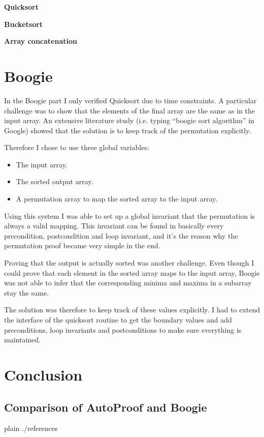 \documentclass[a4paper,10pt]{article}
\begin{document}
\textbf{Quicksort}

\textbf{Bucketsort}

\textbf{Array concatenation}

\section {Boogie}

In the Boogie part I only verified Quicksort due to time constraints.
A particular challenge was to show that the elements of the final array are the same as in the input array.
An extensive literature study (i.e. typing ``boogie sort algorithm'' in Google) showed that the solution is to 
keep track of the permutation explicitly.

Therefore I chose to use three global variables:
\begin{itemize}
 \item The input array.
 \item The sorted output array.
 \item A permutation array to map the sorted array to the input array.
\end{itemize}

Using this system I was able to set up a global invariant that the permutation is always a valid mapping.
This invariant can be found in basically every precondition, postcondition and loop invariant, and it's the reason why the permutation proof became very simple in the end.

Proving that the output is actually sorted was another challenge.
Even though I could prove that each element in the sorted array maps to the input array,
Boogie was not able to infer that the corresponding minima and maxima in a subarray stay the same.

The solution was therefore to keep track of these values explicitly.
I had to extend the interface of the quicksort routine to get the boundary values and add preconditions, 
loop invariants and postconditions to make sure everything is maintained.

\section {Conclusion}

\subsection{Comparison of AutoProof and Boogie}

\begin{flushleft}
{{{
 {plain}
 {./references}
}}}
\end{flushleft}
\end{document}
